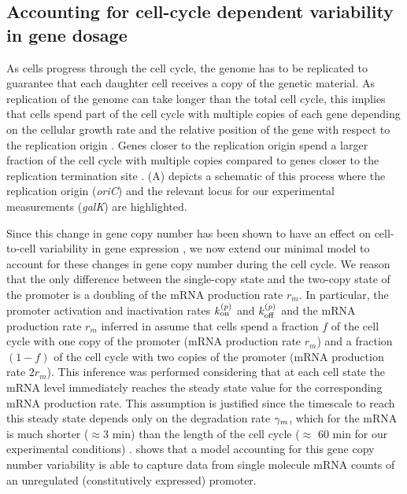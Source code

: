 \subsection{Accounting for cell-cycle dependent variability in gene dosage}
\label{sec_cell_cycle}

As cells progress through the cell cycle, the genome has to be replicated to
guarantee that each daughter cell receives a copy of the genetic material. As
replication of the genome can take longer than the total cell cycle, this
implies that cells spend part of the cell cycle with multiple copies of each
gene depending on the cellular growth rate and the relative position of the
gene with respect to the replication origin \cite{Bremer1996}. Genes closer to
the replication origin spend a larger fraction of the cell cycle with multiple
copies compared to genes closer to the replication termination site
\cite{Bremer1996}. (A) depicts a schematic of this
process where the replication origin ({\it oriC}) and the relevant locus for
our experimental measurements ({\it galK}) are highlighted.

Since this change in gene copy number has been shown to have an effect on
cell-to-cell variability in gene expression \cite{Jones2014a, Peterson2015}, we
now extend our minimal model to account for these changes in gene copy number
during the cell cycle.  We reason that the only difference between the
single-copy state and the two-copy state of the promoter is a doubling of the
mRNA production rate $r_m$. In particular, the promoter activation and
inactivation rates $k^{(p)}_{\text{on}}$ and $k^{(p)}_{\text{off}}$ and the mRNA production rate $r_m$
inferred in  assume that cells spend a fraction $f$ of the
cell cycle  with one copy of the promoter (mRNA production rate $r_m$) and a
fraction $(1-f)$ of the cell cycle with two copies of the promoter (mRNA
production rate $2 r_m$). This inference was performed considering that at each
cell state the mRNA level immediately reaches the steady state value for the
corresponding mRNA production rate. This assumption is justified since the
timescale to reach this steady state depends only on the degradation rate
$\gamma _m$, which for the mRNA  is much shorter ($\approx 3$ min) than the length of
the cell cycle ($\approx$ 60 min for our experimental conditions)
\cite{Dong1995}.  shows that a model accounting for
this gene copy number variability is able to capture data from single molecule
mRNA counts of an unregulated (constitutively expressed) promoter.

